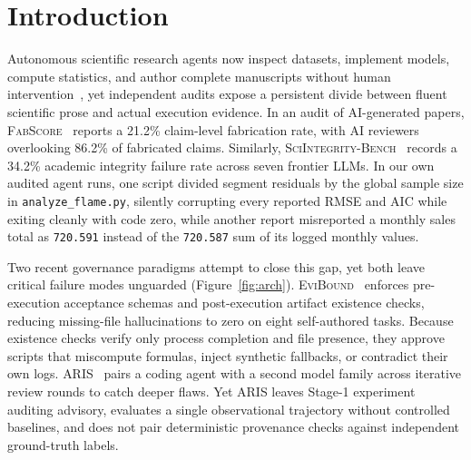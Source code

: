 \section{Introduction}
\label{sec:intro}

Autonomous scientific research agents now inspect datasets, implement models, compute statistics, and author complete manuscripts without human intervention~\citep{yang2026aris,luo2025pitfalls}, yet independent audits expose a persistent divide between fluent scientific prose and actual execution evidence.
In an audit of AI-generated papers, \textsc{FabScore}~\citep{chen2026fabscore} reports a 21.2\% claim-level fabrication rate, with AI reviewers overlooking 86.2\% of fabricated claims.
Similarly, \textsc{SciIntegrity-Bench}~\citep{yang2026sciintegrity} records a 34.2\% academic integrity failure rate across seven frontier LLMs.
In our own audited agent runs, one script divided segment residuals by the global sample size in \texttt{analyze\_flame.py}, silently corrupting every reported RMSE and AIC while exiting cleanly with code zero, while another report misreported a monthly sales total as \texttt{720.591} instead of the \texttt{720.587} sum of its logged monthly values.

Two recent governance paradigms attempt to close this gap, yet both leave critical failure modes unguarded (Figure~\ref{fig:arch}).
\textsc{EviBound}~\citep{chen2026evibound} enforces pre-execution acceptance schemas and post-execution artifact existence checks, reducing missing-file hallucinations to zero on eight self-authored tasks.
Because existence checks verify only process completion and file presence, they approve scripts that miscompute formulas, inject synthetic fallbacks, or contradict their own logs.
\textsc{ARIS}~\citep{yang2026aris} pairs a coding agent with a second model family across iterative review rounds to catch deeper flaws.
Yet \textsc{ARIS} leaves Stage-1 experiment auditing advisory, evaluates a single observational trajectory without controlled baselines, and does not pair deterministic provenance checks against independent ground-truth labels.

